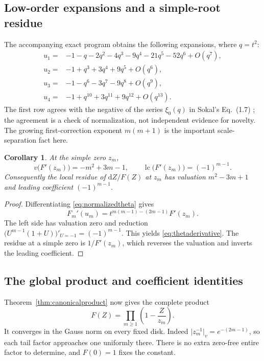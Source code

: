 \documentclass[11pt,a4paper]{article}
\numberwithin{equation}{section}
\newtheorem{corollary}[theorem]{Corollary}
\theoremstyle{definition}
\theoremstyle{remark}
\newcommand{\vabs}[1]{\lvert#1\rvert_v}
\begin{document}
\subsection{Low-order expansions and a simple-root residue}
The accompanying exact program obtains the following expansions, where
$q=t^2$:
\begin{align*}
 u_1={}&-1-q-2q^2-4q^3-9q^4-21q^5-52q^6+O(q^7),\\
 u_2={}&-1+q^3+3q^4+9q^5+O(q^6),\\
 u_3={}&-1-q^6-3q^7-9q^8+O(q^9),\\
 u_4={}&-1+q^{10}+3q^{11}+9q^{12}+O(q^{13}).
\end{align*}
The first row agrees with the negative of the series $\xi_0(q)$ in
Sokal's Eq.~(1.7) \cite{Sokal}; the agreement is a check of normalization, not
independent evidence for novelty. The growing first-correction exponent
$m(m+1)$ is the important scale-separation fact here.

\begin{corollary}\label{cor:thetaresidue}
At the simple zero $z_m$,
\begin{equation}\label{eq:thetaderivative}
 v\bigl(F'(z_m)\bigr)=-m^2+3m-1,
 \qquad
 \operatorname{lc}\bigl(F'(z_m)\bigr)=(-1)^{m-1}.
\end{equation}
Consequently the local residue of $\mathrm dZ/F(Z)$ at $z_m$ has valuation
$m^2-3m+1$ and leading coefficient $(-1)^{m-1}$.
\end{corollary}
\begin{proof}
Differentiating \eqref{eq:normalizedtheta} gives
\[
 F_m'(u_m)=t^{m(m-1)-(2m-1)}F'(z_m).
\]
The left side has valuation zero and reduction
$\bigl(U^{m-1}(1+U)\bigr)'_{U=-1}=(-1)^{m-1}$.
This yields \eqref{eq:thetaderivative}. The residue at a simple zero is
$1/F'(z_m)$, which reverses the valuation and inverts the leading coefficient.
\end{proof}

\subsection{The global product and coefficient identities}
Theorem~\ref{thm:canonicalproduct} now gives the complete product
\begin{equation}\label{eq:thetaprod}
 \boxed{\displaystyle
 F(Z)=\prod_{m\ge1}\left(1-\frac Z{z_m}\right).}
\end{equation}
It converges in the Gauss norm on every fixed disk. Indeed
$\vabs{z_m^{-1}}=e^{-(2m-1)}$, so each tail factor approaches one uniformly
there. There is no extra zero-free entire factor to determine, and $F(0)=1$
fixes the constant.
\end{document}
